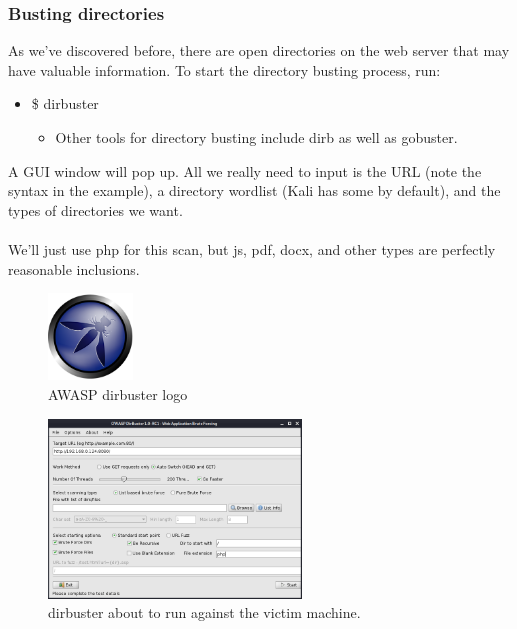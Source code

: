 \documentclass[a4paper,11pt]{article}
\renewcommand{\tt}[2][tt]{\textcolor{#1}{\ttfamily #2}}%
\begin{document}
\subsubsection{Busting directories}
\label{sub2sec:bustingdir}

As we've discovered before, there are open directories on the web server that may have valuable information. To start the directory busting process, run:
\begin{itemize}
    \item \tt{\$ dirbuster}
    \begin{itemize}
        \item Other tools for directory busting include \tt{dirb} as well as \tt{gobuster}.
    \end{itemize}
\end{itemize}
A GUI window will pop up. All we really need to input is the URL (note the syntax in the example), a directory wordlist (Kali has some by default), and the types of directories we want.
\\
\\
We'll just use php for this scan, but js, pdf, docx, and other types are perfectly reasonable inclusions.

\begin{figure}[h]
    \centering
    \includegraphics[width=0.2\textwidth]{images/dirbusterlogo.png}
    \caption{AWASP \tt{dirbuster} logo}
\end{figure}
\pagebreak

\begin{figure}[h]
    \centering
    \includegraphics[width=0.6\textwidth]{images/dirbuster1.png}
    \caption{\tt{dirbuster} about to run against the victim machine.}
    \label{fig:dirbuster1}
\end{figure}
\end{document}
